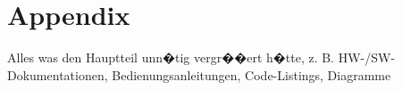 \chapter{Appendix}
\label{sec:a-kapitel}

\raggedright
Alles was den Hauptteil unn�tig vergr��ert h�tte, z. B. HW-/SW-\allowbreak Dokumentationen, Bedienungsanleitungen, Code-Listings, Diagramme
